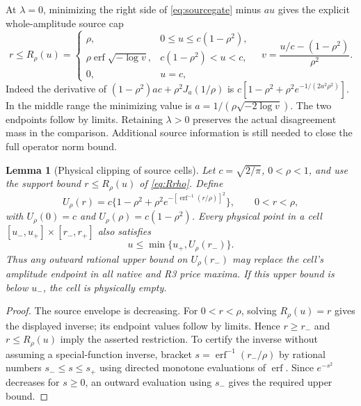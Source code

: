 \documentclass[11pt]{article}
\newtheorem{lemma}[theorem]{Lemma}
\begin{document}
At $\lambda=0$, minimizing the right side of \eqref{eq:sourcegate}
minus $au$ gives the explicit whole-amplitude source cap
\begin{equation}\label{eq:Rrho}
 r\le R_\rho(u)=
 \begin{cases}
 \rho,&0\le u\le c(1-\rho^2),\\
 \rho\operatorname{erf}\!\sqrt{-\log v},
 &c(1-\rho^2)<u<c,\\
 0,&u=c,
 \end{cases}
 \quad v=\frac{u/c-(1-\rho^2)}{\rho^2}.
\end{equation}
Indeed the derivative of
$(1-\rho^2)ac+\rho^2J_a(1/\rho)$ is
$c[1-\rho^2+\rho^2e^{-1/(2a^2\rho^2)}]$.
In the middle range the minimizing value is
$a=1/(\rho\sqrt{-2\log v})$. The two endpoints follow by limits.
Retaining $\lambda>0$ preserves the actual disagreement mass in the
comparison. Additional source information is still needed to close the
full operator norm bound.

\begin{lemma}[Physical clipping of source cells]
\label{lem:physical-source-clipping}
Let $c=\sqrt{2/\pi}$, $0<\rho<1$, and use the support bound
$r\le R_\rho(u)$ of \eqref{eq:Rrho}.  Define
\[
 U_\rho(r)=c\{1-\rho^2+\rho^2
  e^{-[\operatorname{erf}^{-1}(r/\rho)]^2}\},
 \qquad 0<r<\rho,
\]
with $U_\rho(0)=c$ and $U_\rho(\rho)=c(1-\rho^2)$.
Every physical point in a cell
$[u_-,u_+]\times[r_-,r_+]$ also satisfies
\[
 u\le\min\{u_+,U_\rho(r_-)\}.
\]
Thus any outward rational upper bound on $U_\rho(r_-)$ may replace
the cell's amplitude endpoint in all native and R3 price maxima.
If this upper bound is below $u_-$, the cell is physically empty.
\end{lemma}
\begin{proof}
The source envelope is decreasing.  For $0<r<\rho$, solving
$R_\rho(u)=r$ gives the displayed inverse; its endpoint values
follow by limits.  Hence $r\ge r_-$ and $r\le R_\rho(u)$ imply
the asserted restriction.  To certify the inverse without assuming
a special-function inverse, bracket
$s=\operatorname{erf}^{-1}(r_-/\rho)$ by rational numbers
$s_-\le s\le s_+$ using directed monotone evaluations of
$\operatorname{erf}$.  Since $e^{-s^2}$ decreases for $s\ge0$,
an outward evaluation using $s_-$ gives the required upper bound.
\end{proof}
\end{document}

